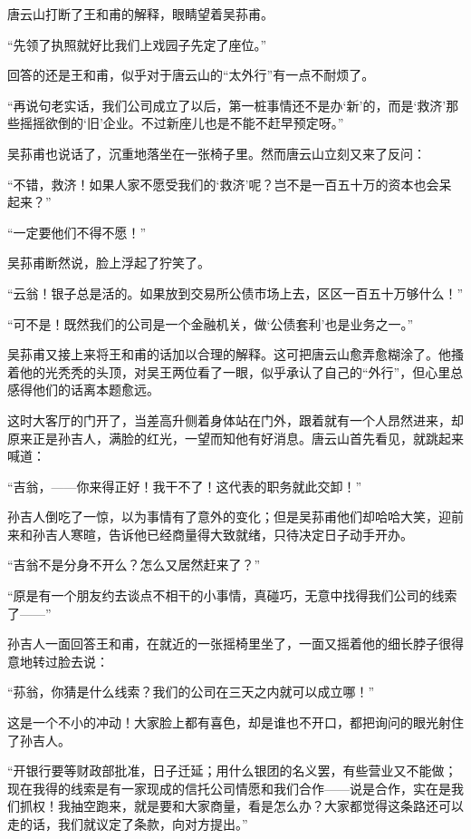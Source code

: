 \par 唐云山打断了王和甫的解释，眼睛望着吴荪甫。
\par “先领了执照就好比我们上戏园子先定了座位。”
\par 回答的还是王和甫，似乎对于唐云山的“太外行”有一点不耐烦了。
\par “再说句老实话，我们公司成立了以后，第一桩事情还不是办‘新’的，而是‘救济’那些摇摇欲倒的‘旧’企业。不过新座儿也是不能不赶早预定呀。”
\par 吴荪甫也说话了，沉重地落坐在一张椅子里。然而唐云山立刻又来了反问：
\par “不错，救济！如果人家不愿受我们的‘救济’呢？岂不是一百五十万的资本也会呆起来？”
\par “一定要他们不得不愿！”
\par 吴荪甫断然说，脸上浮起了狞笑了。
\par “云翁！银子总是活的。如果放到交易所公债市场上去，区区一百五十万够什么！”
\par “可不是！既然我们的公司是一个金融机关，做‘公债套利’也是业务之一。”
\par 吴荪甫又接上来将王和甫的话加以合理的解释。这可把唐云山愈弄愈糊涂了。他搔着他的光秃秃的头顶，对吴王两位看了一眼，似乎承认了自己的“外行”，但心里总感得他们的话离本题愈远。
\par 这时大客厅的门开了，当差高升侧着身体站在门外，跟着就有一个人昂然进来，却原来正是孙吉人，满脸的红光，一望而知他有好消息。唐云山首先看见，就跳起来喊道：
\par “吉翁，——你来得正好！我干不了！这代表的职务就此交卸！”
\par 孙吉人倒吃了一惊，以为事情有了意外的变化；但是吴荪甫他们却哈哈大笑，迎前来和孙吉人寒暄，告诉他已经商量得大致就绪，只待决定日子动手开办。
\par “吉翁不是分身不开么？怎么又居然赶来了？”
\par “原是有一个朋友约去谈点不相干的小事情，真碰巧，无意中找得我们公司的线索了——”
\par 孙吉人一面回答王和甫，在就近的一张摇椅里坐了，一面又摇着他的细长脖子很得意地转过脸去说：
\par “荪翁，你猜是什么线索？我们的公司在三天之内就可以成立哪！”
\par 这是一个不小的冲动！大家脸上都有喜色，却是谁也不开口，都把询问的眼光射住了孙吉人。
\par “开银行要等财政部批准，日子迁延；用什么银团的名义罢，有些营业又不能做；现在我得的线索是有一家现成的信托公司情愿和我们合作——说是合作，实在是我们抓权！我抽空跑来，就是要和大家商量，看是怎么办？大家都觉得这条路还可以走的话，我们就议定了条款，向对方提出。”
